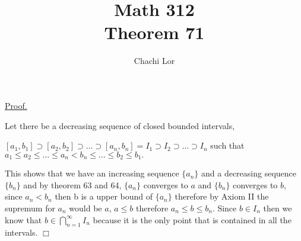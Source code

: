 \documentclass[a4paper]{article}
\title{Math 312\\Theorem 71}
\author{Chachi Lor}
\date{}
\begin{document}
\maketitle
\underline{Proof.}

Let there be a decreasing sequence of closed bounded intervals,

\begin{center}

$[a_1,b_1] \supset [a_2,b_2] \supset \dots \supset [a_n,b_n] = I_1 \supset I_2 \supset \dots \supset I_n$ such that\\

$a_1 \leq a_2 \leq \dots \leq a_n < b_n \leq \dots \leq b_2 \leq b_1.$

\end{center}
This shows that we have an increasing sequence $\{ a_n \}$ and a decreasing sequence $\{ b_n \}$ and by 
theorem 63 and 64, $\{ a_n \}$ converges to $a$ and $\{ b_n \}$ converges to $b$, since $a_n < b_n$ then b is a upper bound of $\{ a_n \}$ therefore by Axiom II the supremum for $a_n$ would be $a$, $a \leq b$ therefore $a_n \leq b \leq b_n$. Since $b \in I_n$ then we know that $b \in \displaystyle\bigcap_{n=1}^\infty I_n$ because it is the only point that is contained in all the intervals. $\Box$
\end{document}
